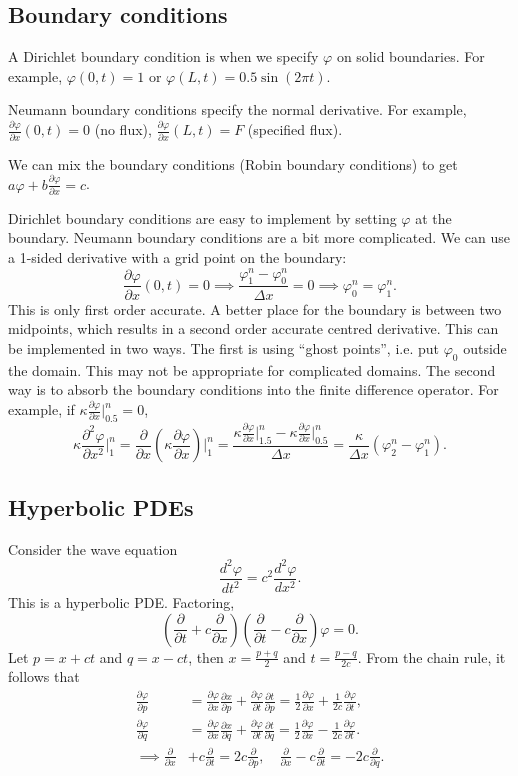 \documentclass[11pt, a4paper]{article}
\renewcommand{\phi}{\varphi}
\theoremstyle{break}
\newcommand*{\Paren}[1]{\left(#1\right)}%
\newcommand{\dx}{\Delta x}
\newcommand{\der}[2]{\frac{\partial #1}{\partial #2}}
\newcommand{\pder}[3][2]{\frac{\partial^#1 #2}{\partial #3^#1}}
\newcommand{\ddder}[3][2]{\frac{d^#1 #2}{d #3^#1}}
\newcommand{\eval}[1]{\big\rvert_{#1}}
\newcommand{\Eval}[1]{\bigg\rvert_{#1}}
\begin{document}
\subsection{Boundary conditions}
A Dirichlet boundary condition is when we specify $\phi$ on solid boundaries. For example, $\phi(0,t)=1$ or $\phi(L,t)=0.5\sin(2\pi t)$.

Neumann boundary conditions specify the normal derivative. For example, $\der\phi x(0,t)=0$ (no flux), $\der\phi x(L,t)=F$ (specified flux).

We can mix the boundary conditions (Robin boundary conditions) to get $a\phi+b\der\phi x=c$.

Dirichlet boundary conditions are easy to implement by setting $\phi$ at the boundary. Neumann boundary conditions are a bit more complicated. We can use a 1-sided derivative with a grid point on the boundary: \[\der\phi x(0,t)=0\implies \frac{\phi_1^n-\phi_0^n}{\dx}=0\implies \phi_0^n=\phi_1^n.\] This is only first order accurate. A better place for the boundary is between two midpoints, which results in a second order accurate centred derivative. This can be implemented in two ways. The first is using ``ghost points'', i.e. put $\phi_0$ outside the domain. This may not be appropriate for complicated domains. The second way is to absorb the boundary conditions into the finite difference operator. For example, if $\kappa \der\phi x\eval{0.5}^n=0$, \[\kappa \pder\phi x\Eval1^n=\der{}x\Paren{\kappa\der\phi x}\Eval 1^n=\frac{\kappa\der\phi x\eval{1.5}^n-\kappa \der\phi x\eval{0.5}^n}{\dx}=\frac{\kappa}{\dx}(\phi_2^n-\phi_1^n).\]


\subsection{Hyperbolic PDEs}
Consider the wave equation \[\ddder\phi t = c^2 \ddder\phi x.  \] This is a hyperbolic PDE. Factoring, \begin{equation}\label{eq:waveRe}\Paren{\der{}t + c\der{}x}\Paren{\der{}{t}-c\der{}x}\phi = 0.\end{equation} Let $p=x+ct$ and $q=x-ct$, then $x=\frac{p+q}2$ and $t=\frac{p-q}{2c}$. From the chain rule, it follows that \begin{align*}\der\phi p&=\der\phi x\der xp+\der\phi t\der tp=\frac12\der\phi x+\frac1{2c}\der\phi t,\\\der\phi q&=\der\phi x\der xq+\der\phi t\der tq=\frac12\der\phi x -\frac{1}{2c}\der \phi t.\\
\implies \der{}x&+c\der{}t = 2c\der{}p,\quad \der{}x-c\der{}t=-2c\der{}q.
\end{align*}
\end{document}
